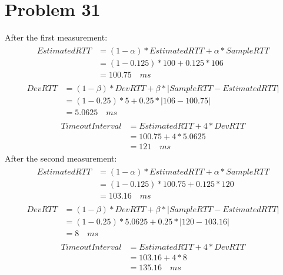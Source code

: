 \documentclass[titlepage, paper=a4, fontsize=11pt]{scrartcl} %
\numberwithin{equation}{section} %
\numberwithin{table}{section} %
\begin{document}

\section*{Problem 31}
After the first measurement:
\begin{align*} 
\begin{split}
EstimatedRTT &= (1-\alpha)*EstimatedRTT + \alpha * SampleRTT \\
&= (1-0.125)*100 + 0.125 * 106 \\
&= 100.75 \quad ms
\end{split}					
\end{align*}
\begin{align*} 
\begin{split}
DevRTT &= (1-\beta)*DevRTT + \beta * | SampleRTT - EstimatedRTT | \\
&= (1-0.25)*5 + 0.25 * | 106 - 100.75 | \\
&= 5.0625 \quad ms
\end{split}					
\end{align*}
\begin{align*} 
\begin{split}
TimeoutInterval &= EstimatedRTT + 4*DevRTT \\
&= 100.75 + 4*5.0625 \\
&= 121 \quad ms
\end{split}					
\end{align*}
After the second measurement:
\begin{align*} 
\begin{split}
EstimatedRTT &= (1-\alpha)*EstimatedRTT + \alpha * SampleRTT \\
&= (1-0.125)*100.75 + 0.125 * 120 \\
&= 103.16 \quad ms
\end{split}					
\end{align*}
\begin{align*} 
\begin{split}
DevRTT &= (1-\beta)*DevRTT + \beta * | SampleRTT - EstimatedRTT | \\
&= (1-0.25)*5.0625 + 0.25 * | 120 - 103.16 | \\
&= 8 \quad ms
\end{split}					
\end{align*}
\begin{align*} 
\begin{split}
TimeoutInterval &= EstimatedRTT + 4*DevRTT \\
&= 103.16 + 4*8 \\
&= 135.16 \quad ms
\end{split}					
\end{align*}
\end{document}

